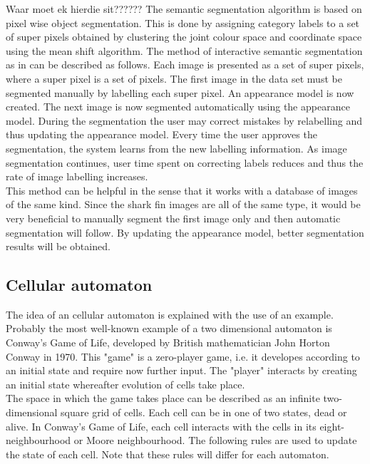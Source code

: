 \documentclass[a4paper,10pt]{article}
\begin{document}
Waar moet ek hierdie sit??????
The semantic segmentation
algorithm is based on pixel wise object segmentation.  This is done by 
assigning category labels to a set of super pixels obtained by clustering the
joint colour space and coordinate space using the mean shift algorithm.
The method of interactive semantic segmentation as in \cite{RF} can be described
as follows.  Each image is presented as a set of super pixels, where 
a super pixel is a set of pixels.  The first image in the data set must be
segmented manually by labelling each super pixel. An appearance model is 
now created.  The next image is now segmented automatically using the appearance
model.  During the segmentation the user may correct mistakes by 
relabelling and thus updating the appearance model.  Every time the user
approves the segmentation, the system learns from the new labelling information.
As image segmentation continues, user time spent on correcting labels reduces
and thus the rate of image labelling increases. \\

This method can be helpful in the sense that it works with a database of images
of the same kind.  Since the shark fin images are all of the same type, 
it would be very beneficial to manually segment the first image only and then
automatic segmentation will follow.  By updating the appearance model, 
better segmentation results will be obtained.  \\ 

\subsection{Cellular automaton}
\label{ca}
The idea of an cellular automaton is explained with the use of an example.
Probably the most well-known example of a two dimensional automaton is Conway's
Game of Life\cite{gol}, developed by British mathematician John Horton Conway in 1970. 
This "game" is a zero-player game, i.e. it developes according to an initial
state
and require now further input.  The "player" interacts by creating an initial
state whereafter evolution of cells take place.  \\

The  space in  which the  game  takes place  can  be described  as an  infinite
two-dimensional square grid of cells.  Each cell can
be in one of two states, dead  or alive.  In Conway's Game of Life, each
cell   interacts  with   the  cells   in  its   eight-neighbourhood  or   Moore
neighbourhood.  The following  rules are used to update the state of each cell.
Note that these rules will differ for each automaton.
\end{document}
